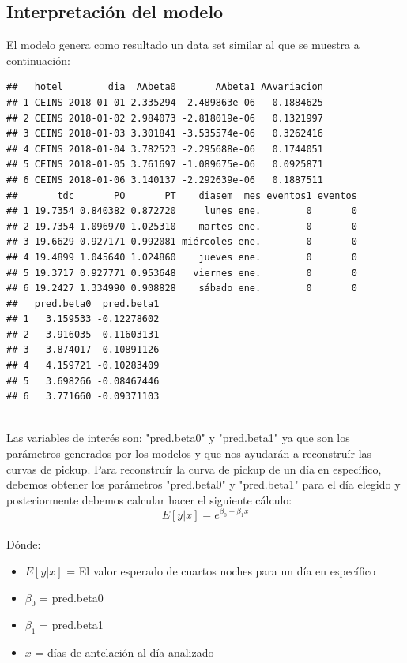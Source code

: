 \documentclass{article}\usepackage[]{graphicx}\usepackage[]{color}
\makeatletter
\newenvironment{kframe}{%
 \def\at@end@of@kframe{}%
 \ifinner\ifhmode%
  \def\at@end@of@kframe{\end{minipage}}%
  \begin{minipage}{\columnwidth}%
 \fi\fi%
 \def\FrameCommand##1{\hskip\@totalleftmargin \hskip-\fboxsep
 \colorbox{shadecolor}{##1}\hskip-\fboxsep
     \hskip-\linewidth \hskip-\@totalleftmargin \hskip\columnwidth}%
 \MakeFramed {\advance\hsize-\width
   \@totalleftmargin\z@ \linewidth\hsize
   \@setminipage}}%
 {\par\unskip\endMakeFramed%
 \at@end@of@kframe}
\newenvironment{knitrout}{}{} %
\makeatother
\begin{document}
\subsection{Interpretación del modelo}
El modelo genera como resultado un data set similar al que se muestra a continuación:
~\\
\begin{knitrout}
\color{fgcolor}\begin{kframe}
\begin{verbatim}
##   hotel        dia  AAbeta0       AAbeta1 AAvariacion
## 1 CEINS 2018-01-01 2.335294 -2.489863e-06   0.1884625
## 2 CEINS 2018-01-02 2.984073 -2.818019e-06   0.1321997
## 3 CEINS 2018-01-03 3.301841 -3.535574e-06   0.3262416
## 4 CEINS 2018-01-04 3.782523 -2.295688e-06   0.1744051
## 5 CEINS 2018-01-05 3.761697 -1.089675e-06   0.0925871
## 6 CEINS 2018-01-06 3.140137 -2.292639e-06   0.1887511
##       tdc       PO       PT    diasem  mes eventos1 eventos
## 1 19.7354 0.840382 0.872720     lunes ene.        0       0
## 2 19.7354 1.096970 1.025310    martes ene.        0       0
## 3 19.6629 0.927171 0.992081 miércoles ene.        0       0
## 4 19.4899 1.045640 1.024860    jueves ene.        0       0
## 5 19.3717 0.927771 0.953648   viernes ene.        0       0
## 6 19.2427 1.334990 0.908828    sábado ene.        0       0
##   pred.beta0  pred.beta1
## 1   3.159533 -0.12278602
## 2   3.916035 -0.11603131
## 3   3.874017 -0.10891126
## 4   4.159721 -0.10283409
## 5   3.698266 -0.08467446
## 6   3.771660 -0.09371103
\end{verbatim}
\end{kframe}
\end{knitrout}
~\\
Las variables de interés son: "pred.beta0" y "pred.beta1" ya que son los parámetros generados por los modelos y que nos ayudarán a reconstruír las curvas de pickup. Para reconstruír la curva de pickup de un día en específico, debemos obtener los parámetros "pred.beta0" y "pred.beta1" para el día elegido y posteriormente debemos calcular hacer el siguiente cálculo: $$E[y|x]=e^{\beta_0 + \beta_1{x}}$$
~\\
Dónde:
\begin{itemize}[noitemsep]
\item $E[y|x]$ = El valor esperado de cuartos noches para un día en específico
\item $\beta_0$ = pred.beta0
\item $\beta_1$ = pred.beta1
\item $x$ = días de antelación al día analizado
\end{itemize}
\end{document}
